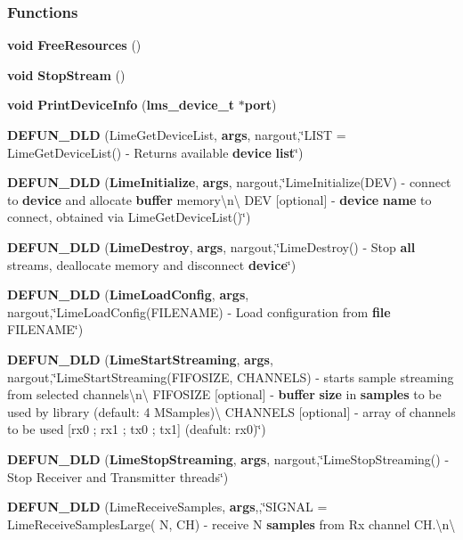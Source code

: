 \subsubsection*{Functions}
\begin{DoxyCompactItemize}
\item 
{\bf void} {\bf Free\+Resources} ()
\item 
{\bf void} {\bf Stop\+Stream} ()
\item 
{\bf void} {\bf Print\+Device\+Info} ({\bf lms\+\_\+device\+\_\+t} $\ast${\bf port})
\item 
{\bf D\+E\+F\+U\+N\+\_\+\+D\+LD} (Lime\+Get\+Device\+List, {\bf args}, nargout,\char`\"{}L\+I\+ST = Lime\+Get\+Device\+List() -\/ Returns available {\bf device} {\bf list}\char`\"{})
\item 
{\bf D\+E\+F\+U\+N\+\_\+\+D\+LD} ({\bf Lime\+Initialize}, {\bf args}, nargout,\char`\"{}Lime\+Initialize(D\+EV) -\/ connect to {\bf device} and allocate {\bf buffer} memory\textbackslash{}n\textbackslash{}
D\+EV [optional] -\/ {\bf device} {\bf name} to connect, obtained via Lime\+Get\+Device\+List()\char`\"{})
\item 
{\bf D\+E\+F\+U\+N\+\_\+\+D\+LD} ({\bf Lime\+Destroy}, {\bf args}, nargout,\char`\"{}Lime\+Destroy() -\/ Stop {\bf all} streams, deallocate memory and disconnect {\bf device}\char`\"{})
\item 
{\bf D\+E\+F\+U\+N\+\_\+\+D\+LD} ({\bf Lime\+Load\+Config}, {\bf args}, nargout,\char`\"{}Lime\+Load\+Config(F\+I\+L\+E\+N\+A\+ME) -\/ Load configuration from {\bf file} F\+I\+L\+E\+N\+A\+ME\char`\"{})
\item 
{\bf D\+E\+F\+U\+N\+\_\+\+D\+LD} ({\bf Lime\+Start\+Streaming}, {\bf args}, nargout,\char`\"{}Lime\+Start\+Streaming(F\+I\+F\+O\+S\+I\+ZE, C\+H\+A\+N\+N\+E\+LS) -\/ starts sample streaming from selected channels\textbackslash{}n\textbackslash{}
 F\+I\+F\+O\+S\+I\+ZE [optional] -\/ {\bf buffer} {\bf size} in {\bf samples} to be used by library (default\+: 4 M\+Samples)\textbackslash{}
 C\+H\+A\+N\+N\+E\+LS [optional] -\/ array of channels to be used [rx0 ; rx1 ; tx0 ; tx1] (deafult\+: rx0)\char`\"{})
\item 
{\bf D\+E\+F\+U\+N\+\_\+\+D\+LD} ({\bf Lime\+Stop\+Streaming}, {\bf args}, nargout,\char`\"{}Lime\+Stop\+Streaming() -\/ Stop Receiver and Transmitter threads\char`\"{})
\item 
{\bf D\+E\+F\+U\+N\+\_\+\+D\+LD} (Lime\+Receive\+Samples, {\bf args},,\char`\"{}S\+I\+G\+N\+AL = Lime\+Receive\+Samples\+Large( N, CH) -\/ receive N {\bf samples} from Rx channel C\+H.\textbackslash{}n\textbackslash{}

\end{DoxyCompactItemize}
